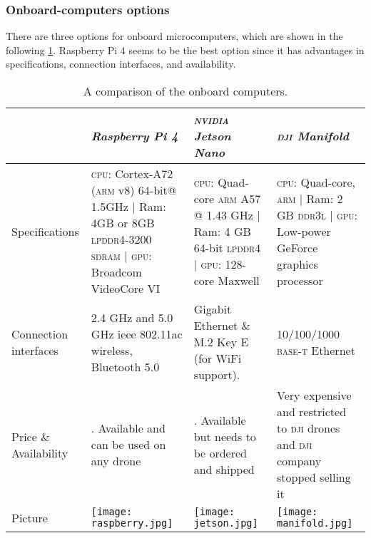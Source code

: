 \documentclass[../main.tex]{subfiles}
\begin{document}
\subsubsection{Onboard-computers options}
There are three options for onboard microcomputers, 
which are shown in the following 
\cref{tab:onboard-computers}. Raspberry Pi 4 seems 
to be the best option since it has advantages 
in specifications, connection interfaces, 
and availability.

\begin{table}[H]
	\centering
	\caption{A comparison of the onboard computers.}
	\label{tab:onboard-computers}  
	\begin{tabular}{ p{3cm} p{4cm} p{4cm} p{4cm} }
		\toprule
		\textit{} & \textit{Raspberry Pi 4} & \textit{\textsc{nvidia} Jetson Nano} & 
		\textit{\textsc{dji} Manifold}\\ \midrule
		Specifications  & \textsc{cpu}: Cortex-A72 (\textsc{arm} v8) 64-bit@ 1.5GHz | Ram: 4GB or 8GB \textsc{lpddr4}-3200 \textsc{sdram} | \textsc{gpu}: Broadcom VideoCore VI & 
		\textsc{cpu}: Quad-core \textsc{arm} A57 @ 1.43 GHz | Ram: 4 GB 64-bit 
		\textsc{lpddr4}   | \textsc{gpu}: 128-core Maxwell & \textsc{cpu}: Quad-core, 
		\textsc{arm} | Ram: 2 GB \textsc{ddr3l} | \textsc{gpu}: Low-power GeForce
		 graphics processor \\ \addlinespace
		Connection interfaces & 2.4 GHz and 5.0 GHz \gls{ieee} 802.11ac wireless,
		 Bluetooth 5.0 & Gigabit Ethernet \& M.2 Key E (for WiFi support). &10/100/1000 
		 \textsc{base-t} Ethernet \\ \addlinespace
		
		Price \& Availability & \qar{300}. Available and can be used on any drone & 
		\qar{400}. Available but needs to be ordered and shipped & Very expensive 
		and restricted to \textsc{dji} drones and \textsc{dji} company stopped 
		selling it \\ \addlinespace
		Picture & \begin{minipage}{.2\textwidth}
			\texttt{[image: raspberry.jpg]}
		\end{minipage}  & \begin{minipage}{.2\textwidth}
			\texttt{[image: jetson.jpg]}
		\end{minipage} & \begin{minipage}{.2\textwidth}
			\texttt{[image: manifold.jpg]}
		\end{minipage} \\
		\bottomrule
	\end{tabular}
\end{table}
\end{document}
